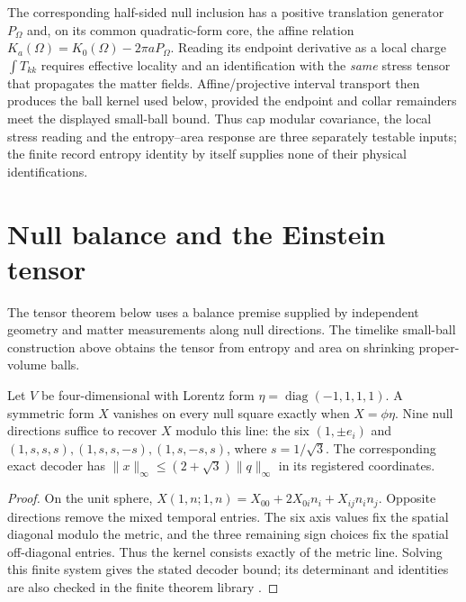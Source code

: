 \documentclass[11pt]{article}
\begin{document}
The corresponding half-sided null inclusion has a positive translation
generator $P_\Omega$ and, on its common quadratic-form core, the affine
relation $K_a(\Omega)=K_0(\Omega)-2\pi aP_\Omega$. Reading its endpoint
derivative as a local charge $\int T_{kk}$ requires effective locality and
an identification with the \emph{same} stress tensor that propagates the
matter fields. Affine/projective interval transport then produces the
ball kernel used below, provided the endpoint and collar remainders meet
the displayed small-ball bound. Thus cap modular covariance, the local
stress reading and the entropy--area response are three separately
testable inputs; the finite record entropy identity by itself supplies
none of their physical identifications.

\section{Null balance and the Einstein tensor}
\label{sec:einstein-tensor}

The tensor theorem below uses a balance premise supplied by independent
geometry and matter measurements along null directions. The timelike
small-ball construction above obtains the tensor from entropy and area
on shrinking proper-volume balls.

\begin{theorem}
\leavevmode\par\raggedright
Let $V$ be four-dimensional with Lorentz form
$\eta=\operatorname{diag}(-1,1,1,1)$. A symmetric form $X$ vanishes on every
null square exactly when $X=\phi\eta$. Nine null directions suffice to
recover $X$ modulo this line: the six $(1,\pm e_i)$ and
$(1,s,s,s),(1,s,s,-s),(1,s,-s,s)$, where $s=1/\sqrt3$.
The corresponding exact decoder has
$\|x\|_\infty\leq(2+\sqrt3)\|q\|_\infty$ in its registered coordinates.
\end{theorem}
\begin{proof}
On the unit sphere, $X(1,n;1,n)=X_{00}+2X_{0i}n_i+X_{ij}n_in_j$.
Opposite directions remove the mixed temporal entries. The six axis
values fix the spatial diagonal modulo the metric, and the three
remaining sign choices fix the spatial off-diagonal entries. Thus the
kernel consists exactly of the metric line. Solving this finite system
gives the stated decoder bound; its determinant and identities are also
checked in the finite theorem library \cite{ophrepo}.
\end{proof}
\end{document}
